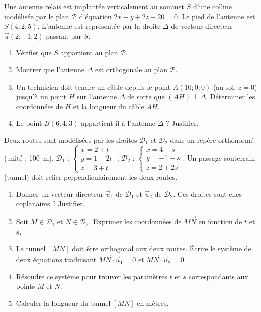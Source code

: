 \documentclass[11pt]{article}
\begin{document}
\begin{exercice}
Une antenne relais est implantée verticalement au sommet $S$ d'une colline modélisée par le plan $\mathcal{P}$ d'équation $2x - y + 2z - 20 = 0$. 
Le pied de l'antenne est $S(4;2;5)$. L'antenne est représentée par la droite $\Delta$ de vecteur directeur $\vec u(2;-1;2)$ passant par $S$.
\begin{enumerate}
    \item Vérifier que $S$ appartient au plan $\mathcal{P}$.
    \item Montrer que l'antenne $\Delta$ est orthogonale au plan $\mathcal{P}$.
    \item Un technicien doit tendre un câble depuis le point $A(10;0;0)$ (au sol, $z=0$) jusqu'à un point $H$ sur l'antenne $\Delta$ de sorte que $(AH) \perp \Delta$. 
    Déterminer les coordonnées de $H$ et la longueur du câble $AH$.
    \item Le point $B(6;4;3)$ appartient-il à l'antenne $\Delta$ ? Justifier.
\end{enumerate}
\end{exercice}

\begin{exercice}
Deux routes sont modélisées par les droites $\mathcal{D}_1$ et $\mathcal{D}_2$ dans un repère orthonormé (unité : \SI{100}{m}). 
$\mathcal{D}_1$ : $\begin{cases} x = 2 + t \\ y = 1 - 2t \\ z = 3 + t \end{cases}$ ; $\mathcal{D}_2$ : $\begin{cases} x = 4 - s \\ y = -1 + s \\ z = 2 + 2s \end{cases}$.
Un passage souterrain (tunnel) doit relier perpendiculairement les deux routes.
\begin{enumerate}
    \item Donner un vecteur directeur $\vec u_1$ de $\mathcal{D}_1$ et $\vec u_2$ de $\mathcal{D}_2$. Ces droites sont-elles coplanaires ? Justifier.
    \item Soit $M \in \mathcal{D}_1$ et $N \in \mathcal{D}_2$. Exprimer les coordonnées de $\overrightarrow{MN}$ en fonction de $t$ et $s$.
    \item Le tunnel $[MN]$ doit être orthogonal aux deux routes. Écrire le système de deux équations traduisant $\overrightarrow{MN} \cdot \vec u_1 = 0$ et $\overrightarrow{MN} \cdot \vec u_2 = 0$.
    \item Résoudre ce système pour trouver les paramètres $t$ et $s$ correspondants aux points $M$ et $N$.
    \item Calculer la longueur du tunnel $[MN]$ en mètres.
\end{enumerate}
\end{exercice}
\end{document}
